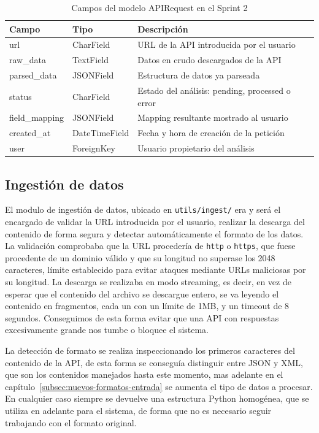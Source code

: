 \begin{table}[H]
    \centering
    \begin{tabular}{|l|l|p{8cm}|}
        \hline
        \textbf{Campo} & \textbf{Tipo} & \textbf{Descripción} \\
        \hline
        url & CharField & URL de la API introducida por el usuario \\
        \hline
        raw\_data & TextField & Datos en crudo descargados de la API \\
        \hline
        parsed\_data & JSONField & Estructura de datos ya parseada \\
        \hline
        status & CharField & Estado del análisis: pending, processed o error \\
        \hline
        field\_mapping & JSONField & Mapping resultante mostrado al usuario \\
        \hline
        created\_at & DateTimeField & Fecha y hora de creación de la petición \\
        \hline
        user & ForeignKey & Usuario propietario del análisis \\
        \hline
    \end{tabular}
    \caption{Campos del modelo APIRequest en el Sprint 2}
    \label{tab:modelo-apirequest}
\end{table}


\subsection{Ingestión de datos}
\label{subsec:ingestion-datos}

El modulo de ingestión de datos, ubicado en \texttt{utils/ingest/} era y será el encargado de validar la URL introducida por el usuario, realizar la descarga del contenido
de forma segura y detectar automáticamente el formato de los datos. La validación comprobaba que la URL procedería de \texttt{http} o \texttt{https}, que fuese
procedente de un dominio válido y que su longitud no superase los 2048 caracteres, límite establecido para evitar ataques mediante URLs maliciosas por su longitud. La descarga se realizaba en modo streaming, es decir, en vez de esperar que
el contenido del archivo se descargue entero, se va leyendo el contenido en fragmentos, cada un con un límite de 1MB, y un timeout de 8 segundos. Conseguimos de 
esta forma evitar que una API con respuestas excesivamente grande nos tumbe o bloquee el sistema.

La detección de formato se realiza inspeccionando los primeros caracteres del contenido de la API, de esta forma se conseguía distinguir entre JSON y XML, que son 
los contenidos manejados hasta este momento, mas adelante en el capítulo~\ref{subsec:nuevos-formatos-entrada} se aumenta el tipo de datos a procesar. En cualquier caso 
siempre se devuelve una estructura Python homogénea, que se utiliza en adelante para el sistema, de forma que no es necesario seguir trabajando con el formato 
original.

